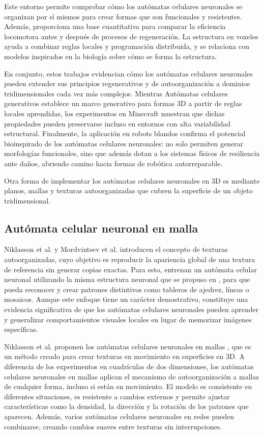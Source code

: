 Este entorno permite comprobar cómo los autómatas celulares neuronales se organizan por sí mismos para crear formas que son funcionales y resistentes. Además, proporciona una base cuantitativa para comparar la eficiencia locomotora antes y después de procesos de regeneración. La estructura en voxeles ayuda a combinar reglas locales y programación distribuida, y se relaciona con modelos inspirados en la biología sobre cómo se forma la estructura.

En conjunto, estos trabajos evidencian cómo los autómatas celulares neuronales pueden extender sus principios regenerativos y de autoorganización a dominios tridimensionales cada vez más complejos. Mientras Autómatas celulares generativos establece un marco generativo para formas 3D a partir de reglas locales aprendidas, los experimentos en Minecraft muestran que dichas propiedades pueden preservarse incluso en entornos con alta variabilidad estructural. Finalmente, la aplicación en robots blandos confirma el potencial bioinspirado de los autómatas celulares neuronales: no solo permiten generar morfologías funcionales, sino que además dotan a los sistemas físicos de resiliencia ante daños, abriendo camino hacia formas de robótica autorreparable.

Otra forma de implementar los autómatas celulares neuronales en 3D es mediante planos, mallas y texturas autoorganizadas que cubren la superficie de un objeto tridimensional. 

\subsection{Autómata celular neuronal en malla}

Niklasson et al. \cite{niklassonMNCA} y Mordvintsev et al. \cite{niklassonMNCA2} \cite{mordvintsevUNCA} introducen el concepto de texturas autoorganizadas, cuyo objetivo es reproducir la apariencia global de una textura de referencia sin generar copias exactas. Para esto, entrenan un autómata celular neuronal utilizando la misma estructura neuronal que se propuso en \cite{mordvintsevNCA}, para que pueda reconocer y crear patrones distintivos como tableros de ajedrez, líneas o mosaicos. Aunque este enfoque tiene un carácter demostrativo, constituye una evidencia significativa de que los autómatas celulares neuronales pueden aprender y generalizar comportamientos visuales locales en lugar de memorizar imágenes específicas.

Niklasson et al. proponen los autómatas celulares neuronales en mallas \cite{meshNCA}, que es un método creado para crear texturas en movimiento en superficies en 3D. A diferencia de los experimentos en cuadrículas de dos dimensiones, los autómatas celulares neuronales en mallas aplican el mecanismo de autoorganización a mallas de cualquier forma, incluso si están en movimiento. El modelo es consistente en diferentes situaciones, es resistente a cambios externos y permite ajustar características como la densidad, la dirección y la rotación de los patrones que aparecen. Además, varios autómatas celulares neuronales en redes pueden combinarse, creando cambios suaves entre texturas sin interrupciones.

